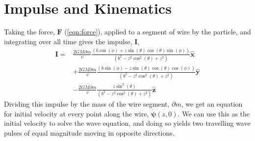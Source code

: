 \documentclass{report}
\begin{document}
\section*{Impulse and Kinematics}
Taking the force, $\mathbf{F}$ (\ref{eqn:force}), applied to a segment of wire by the particle, and integrating over all time gives the impulse, $\mathbf{I}$,
\begin{align}
    \nonumber\mathbf{I}= & \frac{2 G M \partial m}{v} \frac{(b \cos (\phi )+z \sin (\theta ) \cos (\theta ) \sin (\phi ))}{\left(b^2-z^2 \cos ^2(\theta )+z^2\right)} \mathbf{\hat x}\\
    \nonumber            & +\frac{2 G M \partial m}{v} \frac{(b \sin (\phi )-z \sin (\theta ) \cos (\theta ) \cos (\phi ))}{\left(b^2-z^2 \cos ^2(\theta )+z^2\right)} \mathbf{\hat y}\\
                         &  -\frac{2 G M \partial m}{v} \frac{z \sin ^2(\theta )}{\left(b^2-z^2 \cos ^2(\theta )+z^2\right)} \mathbf{\hat z}
    \label{eqn:impulse}
\end{align}
Dividing this impulse by the mass of the wire segment, $\partial m$, we get an equation for initial velocity at every point along the wire, $\mathbf{\dot\psi} (z, 0)$. 
We can use this as the initial velocity to solve the wave equation, and doing so yields two travelling wave pulses of equal magnitude moving in opposite directions.

\end{document}
